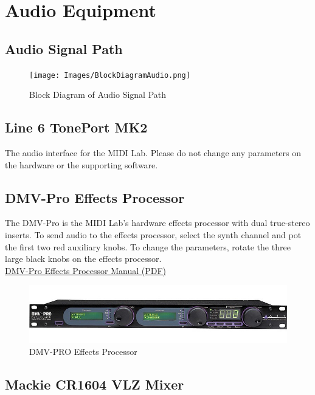 \section{Audio Equipment}
\subsection{Audio Signal Path}

\begin{figure}[h]
\centering
\texttt{[image: Images/BlockDiagramAudio.png]}
\caption{Block Diagram of Audio Signal Path}
\label{fig:fullfig}
\end{figure}

\subsection{Line 6 TonePort MK2}

The audio interface for the MIDI Lab. Please do not change any parameters on the hardware or the supporting software. 

\subsection{DMV-Pro Effects Processor}

The DMV-Pro is the MIDI Lab's hardware effects processor with dual true-stereo inserts. To send audio to the effects processor, select the synth channel and pot the first two red auxiliary knobs. To change the parameters, rotate the three large black knobs on the effects processor.\\
\linebreak
\href{https://github.com/dkadyrov/MIDILab/blob/master/Manuals/DMV_Pro.pdf}{DMV-Pro Effects Processor Manual (PDF)}

\begin{figure}[h]
\centering
\includegraphics[width=.85\textwidth]{Images/DMVPRO.jpg}
\caption{DMV-PRO Effects Processor}
\label{fig:fullfig}
\end{figure}

\newpage
\subsection{Mackie CR1604 VLZ Mixer}

